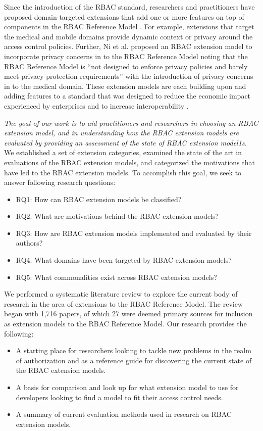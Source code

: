 Since the introduction of the RBAC standard, researchers and practitioners have proposed domain-targeted extensions that add one or more features on top of components in the RBAC Reference Model \cite{kuhn2010adding}.
For example, extensions that target the medical and mobile domains provide dynamic context or privacy around the access control policies.
Further, Ni et al. \cite{ni2010privacy} proposed an RBAC extension model to incorporate privacy concerns in to the RBAC Reference Model noting that the RBAC Reference Model is ``not designed to enforce privacy policies and barely meet privacy protection requirements'' with the introduction of privacy concerns in to the medical domain.
These extension models are each building upon and adding features to a standard that was designed to reduce the economic impact experienced by enterprises and to increase interoperability \cite{o20102010}.

\textit{The goal of our work is to aid practitioners and researchers in choosing an RBAC extension model, and in understanding
how the RBAC extension models are evaluated by providing an assessment of the state of RBAC extension model1s.} We established a set of extension categories, examined the state of the art in evaluations of the RBAC extension models, and categorized the motivations that have led to the RBAC extension models.
To accomplish this goal, we seek to answer following research questions:

\begin{itemize}
\setlength{\itemsep}{0.25pt}
\item RQ1: How can RBAC extension models be classified?
\item RQ2: What are motivations behind the RBAC extension models?
\item RQ3: How are RBAC extension models implemented and evaluated by their authors?
\item RQ4: What domains have been targeted by RBAC extension models?
\item RQ5: What commonalities exist across RBAC extension models?
\end{itemize}

We performed a systematic literature review to explore the current body of research in the area of extensions to the RBAC Reference Model. 
The review began with 1,716 papers, of which 27 were deemed primary sources for inclusion as extension models to the RBAC Reference Model.
Our research provides the following:

\begin{itemize}
\setlength{\itemsep}{0.25pt}
\item A starting place for researchers looking to tackle new problems in the realm of authorization and as a reference guide for discovering
the current state of the RBAC extension models. 
\item A basis for comparison and look up for what extension model to use for developers looking to find a model to fit their access control needs.
\item A summary of current evaluation methods used in research on RBAC extension models.
\end{itemize}

